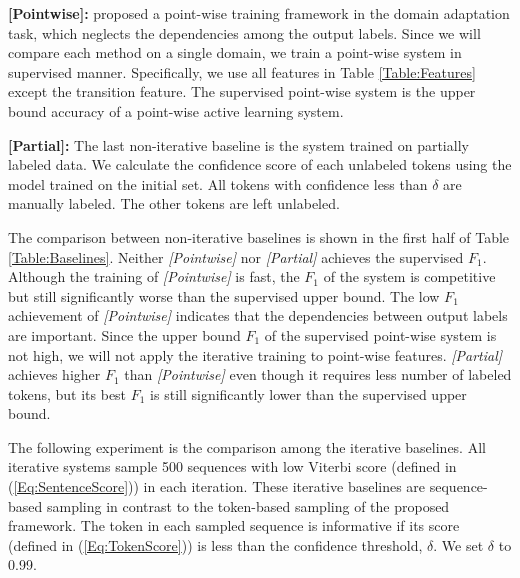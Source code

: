 \documentclass[english]{jnlp_JS2.0}
\begin{document}
\textbf{[Pointwise]:} \cite{Neubig2010} proposed a point-wise training framework in the domain adaptation task, which neglects the dependencies among the output labels. Since we will compare each method on a single domain, we train a point-wise system in supervised manner. Specifically, we use all features in Table \ref{Table:Features} except the transition feature. The supervised point-wise system is the upper bound accuracy of a point-wise active learning system.

\textbf{[Partial]:} The last non-iterative baseline is the system trained on partially labeled data. We calculate the confidence score of each unlabeled tokens using the model trained on the initial set. All tokens with confidence less than $\delta$ are manually labeled. The other tokens are left unlabeled.

The comparison between non-iterative baselines is shown in the first half of Table \ref{Table:Baselines}. Neither \textit{[Pointwise]} nor \textit{[Partial]} achieves the supervised $F_1$. Although the training of \textit{[Pointwise]} is fast, the $F_1$ of the system is competitive but still significantly worse than the supervised upper bound. The low $F_1$ achievement of \textit{[Pointwise]} indicates that the dependencies between output labels are important. Since the upper bound $F_1$ of the supervised point-wise system is not high, we will not apply the iterative training to point-wise features. \textit{[Partial]} achieves higher $F_1$ than \textit{[Pointwise]} even though it requires less number of labeled tokens, but its best $F_1$ is still significantly lower than the supervised upper bound.

\begin{table}[t]
	\label{Table:Baselines}

\end{table}

The following experiment is the comparison among the iterative baselines. All iterative systems sample 500 sequences with low Viterbi score (defined in (\ref{Eq:SentenceScore})) in each iteration. These iterative baselines are sequence-based sampling in contrast to the token-based sampling of the proposed framework. The token in each sampled sequence is informative if its score (defined in (\ref{Eq:TokenScore})) is less than the confidence threshold, $\delta$. We set $\delta$ to 0.99.
\end{document}
